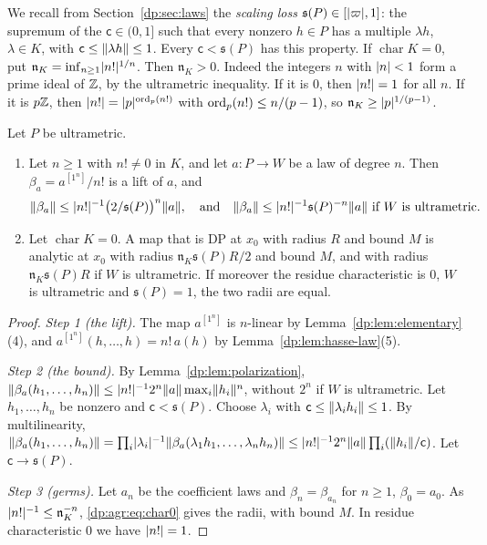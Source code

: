 We recall from Section~\ref{dp:sec:laws} the \emph{scaling loss} $\mathfrak s(P)\in[\lvert \varpi\rvert,1]$: the supremum of the $\mathsf c\in(0,1]$ such that every nonzero $h\in P$ has a multiple $\lambda h$, $\lambda\in K$, with $\mathsf c\le\lVert \lambda h\rVert\le1$. Every $\mathsf c<\mathfrak s(P)$ has this property. If $\operatorname{char}K=0$, put $\mathfrak n_K=\inf_{n\ge1}\lvert n!\rvert^{1/n}$. Then $\mathfrak n_K>0$. Indeed the integers $n$ with $\lvert n\rvert<1$ form a prime ideal of $\mathbb Z$, by the ultrametric inequality. If it is $0$, then $\lvert n!\rvert=1$ for all $n$. If it is $p\mathbb Z$, then $\lvert n!\rvert=\lvert p\rvert^{\operatorname{ord}_p(n!)}$ with $\operatorname{ord}_p(n!)\le n/(p-1)$, so $\mathfrak n_K\ge\lvert p\rvert^{1/(p-1)}$.

\begin{theorem}\label{dp:thm:agreement-char0}
Let $P$ be ultrametric.
\begin{enumerate}
\item Let $n\ge1$ with $n!\ne0$ in $K$, and let $a\colon P\to W$ be a law of degree $n$. Then $\beta_a=a^{[1^n]}/n!$ is a lift of $a$, and
\begin{equation}\label{dp:agr:eq:char0}
 \lVert \beta_a\rVert\le\lvert n!\rvert^{-1}\bigl(2/\mathfrak s(P)\bigr)^n\lVert a\rVert,\quad\text{and}\quad\lVert \beta_a\rVert\le\lvert n!\rvert^{-1}\mathfrak s(P)^{-n}\lVert a\rVert\text{ if $W$ is ultrametric.}
\end{equation}
\item Let $\operatorname{char}K=0$. A map that is DP at $x_0$ with radius $R$ and bound $M$ is analytic at $x_0$ with radius $\mathfrak n_K\mathfrak s(P)R/2$ and bound $M$, and with radius $\mathfrak n_K\mathfrak s(P)R$ if $W$ is ultrametric. If moreover the residue characteristic is $0$, $W$ is ultrametric and $\mathfrak s(P)=1$, the two radii are equal.
\end{enumerate}
\end{theorem}

\begin{proof}
\emph{Step 1 (the lift).} The map $a^{[1^n]}$ is $n$\nobreakdash-linear by Lemma~\ref{dp:lem:elementary}(4), and $a^{[1^n]}(h,\dots,h)=n!\,a(h)$ by Lemma~\ref{dp:lem:hasse-law}(5).

\emph{Step 2 (the bound).} By Lemma~\ref{dp:lem:polarization}, $\lVert \beta_a(h_1,\dots,h_n)\rVert\le\lvert n!\rvert^{-1}2^n\lVert a\rVert\max_i\lVert h_i\rVert^n$, without $2^n$ if $W$ is ultrametric. Let $h_1,\dots,h_n$ be nonzero and $\mathsf c<\mathfrak s(P)$. Choose $\lambda_i$ with $\mathsf c\le\lVert \lambda_ih_i\rVert\le1$. By multilinearity, $\lVert \beta_a(h_1,\dots,h_n)\rVert=\prod_i\lvert \lambda_i\rvert^{-1}\lVert \beta_a(\lambda_1h_1,\dots,\lambda_nh_n)\rVert\le\lvert n!\rvert^{-1}2^n\lVert a\rVert\prod_i(\lVert h_i\rVert/\mathsf c)$. Let $\mathsf c\to\mathfrak s(P)$.

\emph{Step 3 (germs).} Let $a_n$ be the coefficient laws and $\beta_n=\beta_{a_n}$ for $n\ge1$, $\beta_0=a_0$. As $\lvert n!\rvert^{-1}\le\mathfrak n_K^{-n}$, \eqref{dp:agr:eq:char0} gives the radii, with bound $M$. In residue characteristic $0$ we have $\lvert n!\rvert=1$.
\end{proof}

